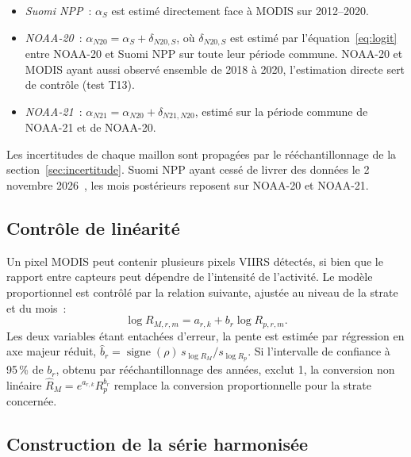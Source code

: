 \documentclass[11pt,a4paper]{article}
\begin{document}
\begin{itemize}
  \item \emph{Suomi NPP}~: $\alpha_S$ est estimé directement face à MODIS sur 2012--2020.
  \item \emph{NOAA-20}~: $\alpha_{N20} = \alpha_S + \delta_{N20,S}$, où $\delta_{N20,S}$ est estimé par l'équation~\eqref{eq:logit} entre NOAA-20 et Suomi NPP sur toute leur période commune. NOAA-20 et MODIS ayant aussi observé ensemble de 2018 à 2020, l'estimation directe sert de contrôle (test T13).
  \item \emph{NOAA-21}~: $\alpha_{N21} = \alpha_{N20} + \delta_{N21,N20}$, estimé sur la période commune de NOAA-21 et de NOAA-20.
\end{itemize}
Les incertitudes de chaque maillon sont propagées par le rééchantillonnage de la section~\ref{sec:incertitude}. Suomi NPP ayant cessé de livrer des données le 2 novembre 2026~\cite{earthdata2026}, les mois postérieurs reposent sur NOAA-20 et NOAA-21.

\subsection{Contrôle de linéarité}

Un pixel MODIS peut contenir plusieurs pixels VIIRS détectés, si bien que le rapport entre capteurs peut dépendre de l'intensité de l'activité. Le modèle proportionnel est contrôlé par la relation suivante, ajustée au niveau de la strate et du mois~:
\begin{equation}
  \log R_{M,r,m} = a_{r,k} + b_r \log R_{p,r,m}.
\end{equation}
Les deux variables étant entachées d'erreur, la pente est estimée par régression en axe majeur réduit, $\hat b_r = \operatorname{signe}(\rho)\, s_{\log R_M}/s_{\log R_p}$. Si l'intervalle de confiance à 95\,\% de $b_r$, obtenu par rééchantillonnage des années, exclut 1, la conversion non linéaire $\hat R_M = e^{a_{r,k}} R_p^{b_r}$ remplace la conversion proportionnelle pour la strate concernée.

\subsection{Construction de la série harmonisée}\label{sec:serie}
\end{document}
